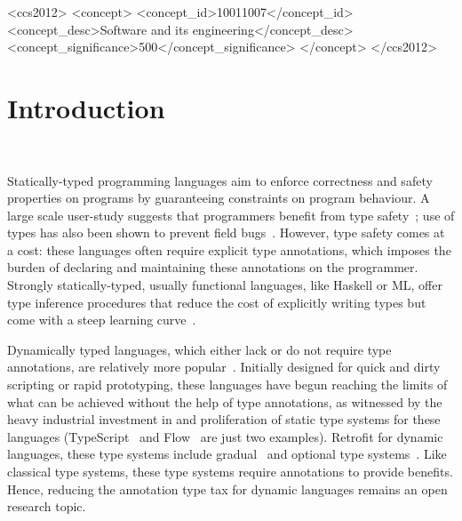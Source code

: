 \documentclass[acmsmall, review, anonymous]{acmart}\settopmatter{printfolios=true,printccs=false,printacmref=false}
\begin{document}
\begin{CCSXML}
<ccs2012>
<concept>
<concept_id>10011007</concept_id>
<concept_desc>Software and its engineering</concept_desc>
<concept_significance>500</concept_significance>
</concept>
</ccs2012>
\end{CCSXML}




\maketitle

\section{Introduction}~\label{}

Statically-typed programming languages aim to enforce correctness and safety properties
on programs by guaranteeing constraints on program behaviour.
A large scale user-study
suggests that programmers
benefit from type safety~\citep{hanenberg14}; use of types has also been
shown to prevent field bugs~\citep{gao17}.
However, type safety comes at a cost: these languages often require explicit type annotations,
which imposes the burden of declaring and maintaining these annotations on the programmer.
Strongly statically-typed, usually functional languages, like Haskell or ML,
offer type inference procedures that reduce
the cost of explicitly writing types but come with
a steep learning curve~\citep{tirronen15}.

Dynamically typed languages, which either lack or do not require type
annotations, are relatively more popular~\cite{meyerovich12}.  Initially
designed for quick and dirty scripting or rapid prototyping, these languages
have begun reaching the limits of what can be achieved without the help of type
annotations, as witnessed by the heavy industrial investment in and proliferation of static type systems for these languages (TypeScript~\cite{typescript} and Flow~\cite{flow} are just two
examples).
Retrofit for dynamic languages, these type systems include gradual~\cite{siek06}
and optional type systems~\citep{bracha2004pluggable}.  Like classical type systems, these type systems
require annotations to provide benefits.  Hence, reducing the annotation type tax
for dynamic languages remains an open research topic.
\end{document}
